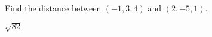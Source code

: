 
\begin{Exercise}[
name={},
title={}, 
difficulty=0,
origin={\cite{SM}}]
Find the distance between $(-1,3,4)$ and $(2,-5,1)$.
\end{Exercise}

\begin{Answer}
$\sqrt{82}$
\end{Answer}
